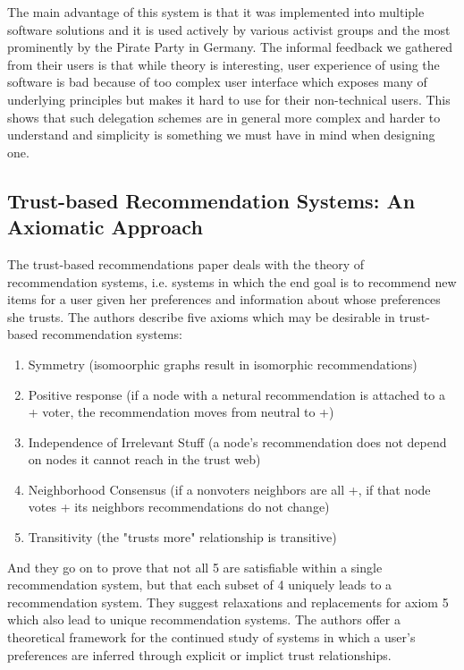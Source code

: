 \documentclass[a4paper]{acm_proc_article-sp}
\begin{document}
The main advantage of this system is that it was implemented into multiple software solutions and it is used actively by
various activist groups and the most prominently by the Pirate Party in Germany. The informal feedback we gathered from
their users is that while theory is interesting, user experience of using the software is bad because of too complex
user interface which exposes many of underlying principles but makes it hard to use for their non-technical users.
This shows that such delegation schemes are in general more complex and harder to understand and simplicity is something we
must have in mind when designing one.

\subsection{Trust-based Recommendation Systems: An Axiomatic Approach}

The trust-based recommendations paper \cite{axioms} deals with the theory of recommendation systems, i.e. systems in which the end goal is to recommend new items for a user given her preferences and information about whose preferences she trusts.  The authors describe five axioms which may be desirable in trust-based recommendation systems:
\begin{enumerate}
	\item Symmetry (isomoorphic graphs result in isomorphic recommendations)
	\item Positive response (if a node with a netural recommendation is attached to a + voter, the recommendation moves from neutral to +)
	\item Independence of Irrelevant Stuff (a node's recommendation does not depend on nodes it cannot reach in the trust web)
	\item Neighborhood Consensus (if a nonvoters neighbors are all +, if that node votes + its neighbors recommendations do not change)
	\item Transitivity (the "trusts more" relationship is transitive)
\end{enumerate}
And they go on to prove that not all 5 are satisfiable within a single recommendation system, but that each subset of 4 uniquely leads to a recommendation system.  They suggest relaxations and replacements for axiom 5 which also lead to unique recommendation systems.  The authors offer a theoretical framework for the continued study of systems in which a user's preferences are inferred through explicit or implict trust relationships.
\end{document}
